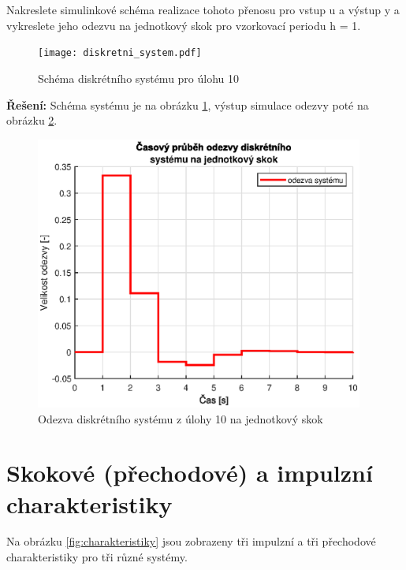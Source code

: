 \documentclass[twoside]{article}
\begin{document}
\subsection{~}
Nakreslete simulinkové schéma realizace tohoto přenosu pro vstup u a výstup y a vykreslete jeho odezvu
na jednotkový skok pro vzorkovací periodu h = 1. \\
\begin{figure}
	\centering
	\texttt{[image: diskretni\_system.pdf]}
	\caption{Schéma diskrétního systému pro úlohu 10}
	\label{fig:diskretni_schema}
\end{figure}
\textbf{Řešení:} Schéma systému je na obrázku \ref{fig:diskretni_schema}, výstup simulace odezvy poté na obrázku \ref{fig:odezva_step}.
\begin{figure}
	\centering
	\includegraphics[height=9cm]{discrete_response_step.eps}
	\caption{Odezva diskrétního systému z úlohy 10 na jednotkový skok}
	\label{fig:odezva_step}
\end{figure}

\newpage

\section{ Skokové (přechodové) a impulzní charakteristiky}
\label{sec:ukol11}
Na obrázku \ref{fig:charakteristiky} jsou zobrazeny tři impulzní a tři přechodové charakteristiky pro tři různé systémy.
\end{document}
